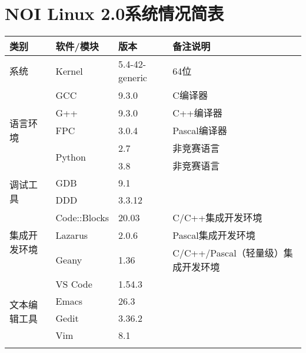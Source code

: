 \chapter{NOI Linux 2.0系统情况简表}
\begin{table}[H]
	\begin{tabular}{|l|l|l|l|}
		\hline
		类别                      & 软件/模块                   & 版本             & 备注说明                    \\ \hline
		系统                      & Kernel                  & 5.4-42-generic & 64位                     \\ \hline
		\multirow{5}{*}{语言环境}   & GCC                     & 9.3.0          & C编译器                    \\ \cline{2-4} 
		& G++                     & 9.3.0          & C++编译器                  \\ \cline{2-4} 
		& FPC                     & 3.0.4          & Pascal编译器               \\ \cline{2-4} 
		& \multirow{2}{*}{Python} & 2.7            & 非竞赛语言                   \\ \cline{3-4} 
		&                         & 3.8            & 非竞赛语言                   \\ \hline
		\multirow{2}{*}{调试工具}   & GDB                     & 9.1            &                         \\ \cline{2-4} 
		& DDD                     & 3.3.12         &                         \\ \hline
		\multirow{3}{*}{集成开发环境} & Code::Blocks            & 20.03          & C/C++集成开发环境             \\ \cline{2-4} 
		& Lazarus                 & 2.0.6          & Pascal集成开发环境            \\ \cline{2-4} 
		& Geany                   & 1.36           & C/C++/Pascal（轻量级）集成开发环境 \\ \hline
		\multirow{7}{*}{文本编辑工具} & VS Code                 & 1.54.3         &                         \\ \cline{2-4} 
		& Emacs                   & 26.3           &                         \\ \cline{2-4} 
		& Gedit                   & 3.36.2         &                         \\ \cline{2-4} 
		& Vim                     & 8.1            &                         \\ \cline{2-4} 

\end{tabular}
\end{table}
